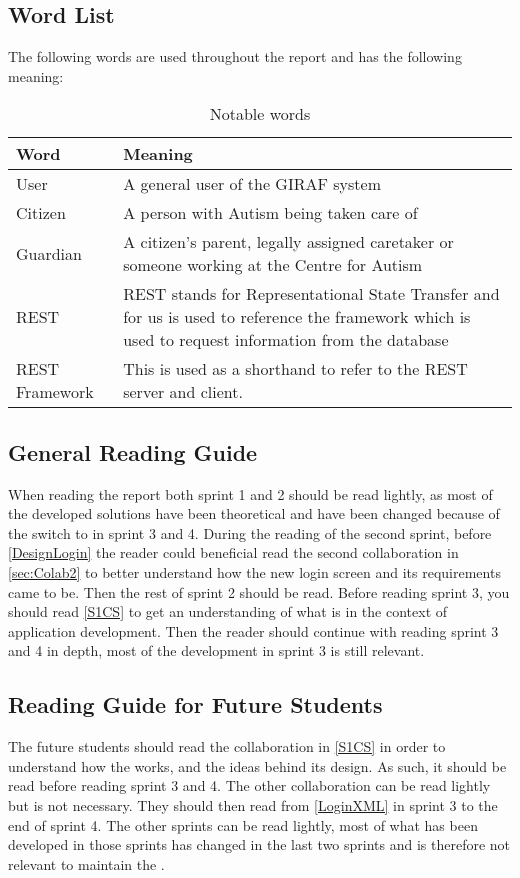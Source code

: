 \subsection{Word List}
The following words are used throughout the report and has the following
meaning:

\begin{table}[H]
\centering

\begin{tabular}{|l|p{6cm}|}
\hline
\textbf{Word} & \textbf{Meaning} \\ \hline
User & A general user of the GIRAF system \\ \hline
Citizen & A person with Autism being taken care of \\ \hline
Guardian & A citizen's parent, legally assigned caretaker or someone working
at the Centre for Autism\\ \hline
REST &  REST stands for Representational State Transfer and for us is used to
reference the framework which is used to request information from the database\\\hline
REST Framework & This is used as a shorthand to refer to the REST server and
client.\\\hline
\end{tabular}
\caption{Notable words}
\end{table}

\subsection{General Reading Guide}
When reading the report both sprint 1 and 2 should be read lightly, as most of
the developed solutions have been theoretical and have been changed because of
the switch to  in sprint 3 and 4. During the reading of the second
sprint, before \autoref{DesignLogin} the reader could beneficial read the second
collaboration in \autoref{sec:Colab2} to better understand how the new login screen and its requirements
came to be. Then the rest of sprint 2 should be read. Before reading sprint 3, you should read
\autoref{S1CS} to get an understanding of what  is in
the context of application development. Then the reader should continue with
reading sprint 3 and 4 in depth, most of the development in sprint 3 is still
relevant.

\subsection{Reading Guide for Future Students}
The future students should read the collaboration in \autoref{S1CS} in order to
understand how the  works, and the ideas behind its
design. As such, it should be read before reading sprint 3 and 4. The other
collaboration can be read lightly but is not necessary. They should then read
from \autoref{LoginXML} in sprint 3 to the end of sprint 4. The other sprints
can be read lightly, most of what has been developed in those sprints has
changed in the last two sprints and is therefore not relevant to maintain the
.